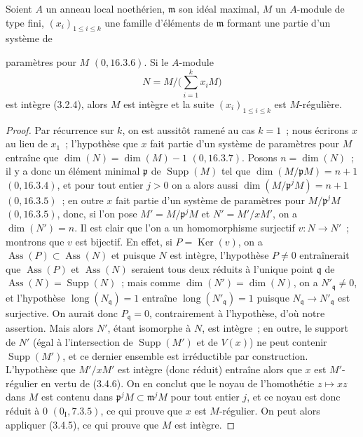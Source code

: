 \begin{corollary}[3.4.7]
\label{IV.2.3.4.7-fr}
Soient $A$ un anneau local noethérien, $\mathfrak m$ son idéal maximal, $M$ un
$A$-module de type fini, $(x_i)_{1\leqslant i\leqslant k}$ une famille
d'éléments de $\mathfrak m$ formant une partie d'un système de


paramètres pour $M$ $(0,16.3.6)$. Si le $A$-module
\[
N=M\Big/\Big(\sum_{i=1}^k x_iM\Big)
\]
est intègre (3.2.4), alors $M$ est intègre et la suite
$(x_i)_{1\leqslant i\leqslant k}$ est $M$-régulière.
\end{corollary}

\begin{proof}
Par récurrence sur $k$, on est aussitôt ramené au cas $k=1$~; nous écrirons
$x$ au lieu de $x_1$~; l'hypothèse que $x$ fait partie d'un système de
paramètres pour $M$ entraîne que
$\dim(N)=\dim(M)-1$ $(0,16.3.7)$. Posons $n=\dim(N)$~; il y a donc un élément
minimal $\mathfrak p$ de $\operatorname{Supp}(M)$ tel que
$\dim(M/\mathfrak pM)=n+1$ $(0,16.3.4)$, et pour tout entier $j>0$ on a alors
aussi $\dim(M/\mathfrak p^jM)=n+1$ $(0,16.3.5)$~; en outre $x$ fait partie
d'un système de paramètres pour $M/\mathfrak p^jM$ $(0,16.3.5)$, donc, si
l'on pose $M'=M/\mathfrak p^jM$ et $N'=M'/xM'$, on a $\dim(N')=n$. Il est
clair que l'on a un homomorphisme surjectif $v:N\to N'$~; montrons que $v$ est
bijectif. En effet, si $P=\operatorname{Ker}(v)$, on a
$\operatorname{Ass}(P)\subset\operatorname{Ass}(N)$ et puisque $N$ est
intègre, l'hypothèse $P\neq0$ entraînerait que $\operatorname{Ass}(P)$ et
$\operatorname{Ass}(N)$ seraient tous deux réduits à l'unique point
$\mathfrak q$ de
$\operatorname{Ass}(N)=\operatorname{Supp}(N)$~; mais comme
$\dim(N')=\dim(N)$, on a $N'_{\mathfrak q}\neq0$, et l'hypothèse
$\operatorname{long}(N_{\mathfrak q})=1$ entraîne
$\operatorname{long}(N'_{\mathfrak q})=1$ puisque
$N_{\mathfrak q}\to N'_{\mathfrak q}$ est surjective. On aurait donc
$P_{\mathfrak q}=0$, contrairement à l'hypothèse, d'où notre assertion.
Mais alors $N'$, étant isomorphe à $N$, est intègre~; en outre, le support de
$N'$ (égal à l'intersection de $\operatorname{Supp}(M')$ et de $V(x)$) ne
peut contenir $\operatorname{Supp}(M')$, et ce dernier ensemble est
irréductible par construction. L'hypothèse que $M'/xM'$ est intègre (donc
réduit) entraîne alors que $x$ est $M'$-régulier en vertu de (3.4.6). On en
conclut que le noyau de l'homothétie $z\mapsto xz$ dans $M$ est contenu dans
$\mathfrak p^jM\subset\mathfrak m^jM$ pour tout entier $j$, et ce noyau est
donc réduit à $0$ $(0_{\mathrm I},7.3.5)$, ce qui prouve que $x$ est
$M$-régulier. On peut alors appliquer (3.4.5), ce qui prouve que $M$ est
intègre.
\end{proof}

